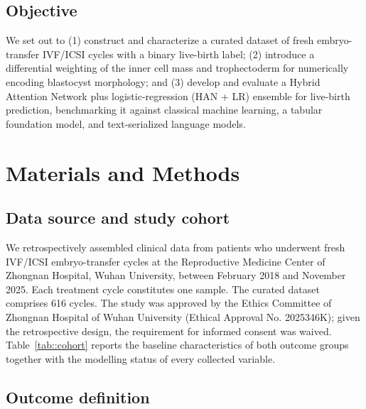 \documentclass[12pt,a4paper]{article}
\begin{document}
\subsection*{Objective}

We set out to (1) construct and characterize a curated dataset of fresh embryo-transfer IVF/ICSI cycles with a binary live-birth label; (2) introduce a differential weighting of the inner cell mass and trophectoderm for numerically encoding blastocyst morphology; and (3) develop and evaluate a Hybrid Attention Network plus logistic-regression (HAN + LR) ensemble for live-birth prediction, benchmarking it against classical machine learning, a tabular foundation model, and text-serialized language models.

\section*{Materials and Methods}

\subsection*{Data source and study cohort}

We retrospectively assembled clinical data from patients who underwent fresh IVF/ICSI embryo-transfer cycles at the Reproductive Medicine Center of Zhongnan Hospital, Wuhan University, between February 2018 and November 2025. Each treatment cycle constitutes one sample. The curated dataset comprises 616 cycles. The study was approved by the Ethics Committee of Zhongnan Hospital of Wuhan University (Ethical Approval No. 2025346K); given the retrospective design, the requirement for informed consent was waived. Table~\ref{tab::cohort} reports the baseline characteristics of both outcome groups together with the modelling status of every collected variable.


\subsection*{Outcome definition}
\end{document}
